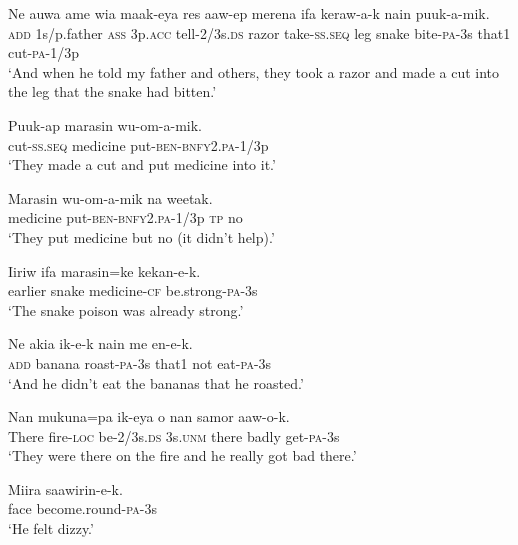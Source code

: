 \ea
\gll  Ne  auwa  ame  wia  maak-eya  res  aaw-ep                  merena  ifa  keraw-a-k  nain  puuk-a-mik. \\
\textsc{add}  1s/p.father  \textsc{ass}  3p.\textsc{acc}  tell-2/3s.\textsc{ds}  razor  take-\textsc{ss.seq}  leg  snake  bite-\textsc{pa}-3s  that1  cut-\textsc{pa}-1/3p \\


\glt ‘And when he told my father and others, they took a razor and made a cut into the leg that the snake had bitten.’ \\
\z


\ea
\gll  Puuk-ap  marasin  wu-om-a-mik. \\
cut-\textsc{ss.seq}  medicine  put-\textsc{ben}-\textsc{bnfy}2.\textsc{pa}-1/3p \\
\glt ‘They made a cut and put medicine into it.’ \\
\z


\ea
\gll  Marasin  wu-om-a-mik  na  weetak. \\
medicine  put-\textsc{ben}-\textsc{bnfy}2.\textsc{pa}-1/3p  \textsc{tp}  no \\
\glt ‘They put medicine but no (it didn’t help).’ \\
\z


\ea
\gll  Iiriw  ifa  marasin=ke  kekan-e-k. \\
earlier  snake  medicine-\textsc{cf}  be.strong-\textsc{pa}-3s \\
\glt ‘The snake poison was already strong.’ \\
\z


\ea
\gll  Ne  akia  ik-e-k  nain  me  en-e-k. \\
\textsc{add}  banana  roast-\textsc{pa}-3s  that1  not  eat-\textsc{pa}-3s \\
\glt ‘And he didn’t eat the bananas that he roasted.’ \\
\z


\ea
\gll  Nan  mukuna=pa  ik-eya  o  nan  samor  aaw-o-k. \\
There  fire-\textsc{loc}  be-2/3s.\textsc{ds}  3s.\textsc{unm}  there  badly  get-\textsc{pa}-3s \\
\glt ‘They were there on the fire and he really got bad there.’ \\
\z


\ea
\gll  Miira  saawirin-e-k. \\
face  become.round-\textsc{pa}-3s \\
\glt ‘He felt dizzy.’ \\
\z


